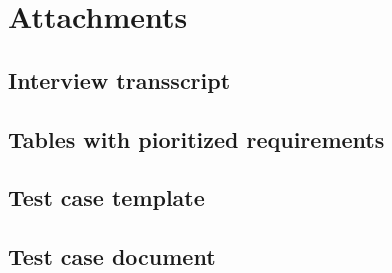 \documentclass[paper=a4, fontsize=11pt,twoside]{scrartcl}	%
\begin{document}
 
\newpage

\section{Attachments}
\setcounter{section}{1}
\subsection{Interview transscript}


\subsection{Tables with pioritized requirements}


\subsection{Test case template}


\subsection{Test case document}

\end{document}

